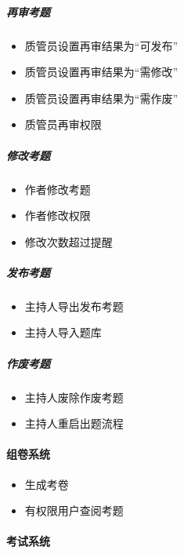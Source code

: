 \documentclass[hyperref, a4paper]{ctexart}
\providecommand{\tightlist}{%
  \setlength{\itemsep}{0pt}\setlength{\parskip}{0pt}}
\let\oldparagraph\paragraph
\renewcommand{\paragraph}[1]{\oldparagraph{#1}\mbox{}}
\let\oldsubparagraph\subparagraph
\renewcommand{\subparagraph}[1]{\oldsubparagraph{#1}\mbox{}}
\begin{document}
\hypertarget{ux518dux5ba1ux8003ux9898}{%
\subparagraph{再审考题}\label{ux518dux5ba1ux8003ux9898}}

\begin{itemize}
\tightlist
\item
  质管员设置再审结果为``可发布''
\item
  质管员设置再审结果为``需修改''
\item
  质管员设置再审结果为``需作废''
\item
  质管员再审权限
\end{itemize}

\hypertarget{ux4feeux6539ux8003ux9898}{%
\subparagraph{修改考题}\label{ux4feeux6539ux8003ux9898}}

\begin{itemize}
\tightlist
\item
  作者修改考题
\item
  作者修改权限
\item
  修改次数超过提醒
\end{itemize}

\hypertarget{ux53d1ux5e03ux8003ux9898}{%
\subparagraph{发布考题}\label{ux53d1ux5e03ux8003ux9898}}

\begin{itemize}
\tightlist
\item
  主持人导出发布考题
\item
  主持人导入题库
\end{itemize}

\hypertarget{ux4f5cux5e9fux8003ux9898}{%
\subparagraph{作废考题}\label{ux4f5cux5e9fux8003ux9898}}

\begin{itemize}
\tightlist
\item
  主持人废除作废考题
\item
  主持人重启出题流程
\end{itemize}

\hypertarget{ux7ec4ux5377ux7cfbux7edf-1}{%
\paragraph{组卷系统}\label{ux7ec4ux5377ux7cfbux7edf-1}}

\begin{itemize}
\tightlist
\item
  生成考卷
\item
  有权限用户查阅考题
\end{itemize}

\hypertarget{ux8003ux8bd5ux7cfbux7edf-1}{%
\paragraph{考试系统}\label{ux8003ux8bd5ux7cfbux7edf-1}}
\end{document}
